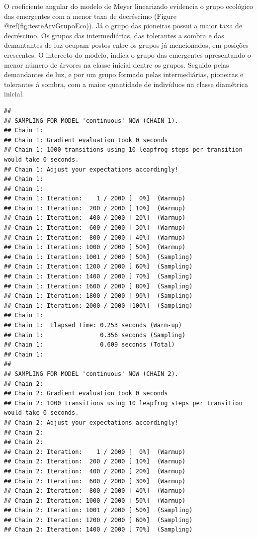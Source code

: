 \documentclass[
]{article}
\begin{document}
O coeficiente angular do modelo de Meyer linearizado evidencia o grupo
ecológico das emergentes com a menor taxa de decréscimo (Figure
@ref(fig:testeArvGrupoEco)). Já o grupo das pioneiras possui a maior
taxa de decréscimo. Os grupos das intermediárias, das tolerantes a
sombra e das demantantes de luz ocupam postos entre os grupos já
mencionados, em posições crescentes. O interceto do modelo, indica o
grupo das emergentes apresentando o menor número de árvores na classe
inicial dentre os grupos. Seguido pelas demandantes de luz, e por um
grupo formado pelas intermediárias, pioneiras e tolerantes à sombra, com
a maior quantidade de indivíduos na classe diamétrica inicial.

\begin{verbatim}
## 
## SAMPLING FOR MODEL 'continuous' NOW (CHAIN 1).
## Chain 1: 
## Chain 1: Gradient evaluation took 0 seconds
## Chain 1: 1000 transitions using 10 leapfrog steps per transition would take 0 seconds.
## Chain 1: Adjust your expectations accordingly!
## Chain 1: 
## Chain 1: 
## Chain 1: Iteration:    1 / 2000 [  0%]  (Warmup)
## Chain 1: Iteration:  200 / 2000 [ 10%]  (Warmup)
## Chain 1: Iteration:  400 / 2000 [ 20%]  (Warmup)
## Chain 1: Iteration:  600 / 2000 [ 30%]  (Warmup)
## Chain 1: Iteration:  800 / 2000 [ 40%]  (Warmup)
## Chain 1: Iteration: 1000 / 2000 [ 50%]  (Warmup)
## Chain 1: Iteration: 1001 / 2000 [ 50%]  (Sampling)
## Chain 1: Iteration: 1200 / 2000 [ 60%]  (Sampling)
## Chain 1: Iteration: 1400 / 2000 [ 70%]  (Sampling)
## Chain 1: Iteration: 1600 / 2000 [ 80%]  (Sampling)
## Chain 1: Iteration: 1800 / 2000 [ 90%]  (Sampling)
## Chain 1: Iteration: 2000 / 2000 [100%]  (Sampling)
## Chain 1: 
## Chain 1:  Elapsed Time: 0.253 seconds (Warm-up)
## Chain 1:                0.356 seconds (Sampling)
## Chain 1:                0.609 seconds (Total)
## Chain 1: 
## 
## SAMPLING FOR MODEL 'continuous' NOW (CHAIN 2).
## Chain 2: 
## Chain 2: Gradient evaluation took 0 seconds
## Chain 2: 1000 transitions using 10 leapfrog steps per transition would take 0 seconds.
## Chain 2: Adjust your expectations accordingly!
## Chain 2: 
## Chain 2: 
## Chain 2: Iteration:    1 / 2000 [  0%]  (Warmup)
## Chain 2: Iteration:  200 / 2000 [ 10%]  (Warmup)
## Chain 2: Iteration:  400 / 2000 [ 20%]  (Warmup)
## Chain 2: Iteration:  600 / 2000 [ 30%]  (Warmup)
## Chain 2: Iteration:  800 / 2000 [ 40%]  (Warmup)
## Chain 2: Iteration: 1000 / 2000 [ 50%]  (Warmup)
## Chain 2: Iteration: 1001 / 2000 [ 50%]  (Sampling)
## Chain 2: Iteration: 1200 / 2000 [ 60%]  (Sampling)
## Chain 2: Iteration: 1400 / 2000 [ 70%]  (Sampling)

\end{verbatim}
\end{document}
